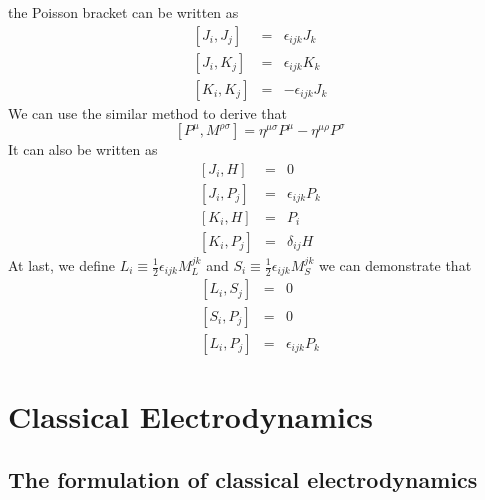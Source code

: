 \documentclass[cyan]{elegantnote}
\begin{document}
the Poisson bracket can be written as
\begin{eqnarray}
\left[J_i,J_j\right] &=& \epsilon_{ijk}J_k \nonumber \\
\left[J_i,K_j\right] &=& \epsilon_{ijk}K_k \nonumber \\
\left[K_i,K_j\right] &=& -\epsilon_{ijk}J_k \nonumber
\end{eqnarray}
We can use the similar method to derive that
\[[P^{\mu},M^{\rho \sigma}] = \eta^{\mu \sigma}P^{\mu} - \eta^{\mu \rho}P^{\sigma}\]
It can also be written as
\begin{eqnarray}
\left[J_i,H\right] &=& 0 \nonumber \\
\left[J_i,P_j\right] &=& \epsilon_{ijk}P_k \nonumber \\
\left[K_i,H\right] &=& P_i \nonumber \\
\left[K_i,P_j\right] &=& \delta_{ij}H \nonumber
\end{eqnarray}
At last, we define $L_i \equiv \frac{1}{2} \epsilon_{ijk} M_L^{jk}$ and $S_i \equiv \frac{1}{2} \epsilon_{ijk} M_S^{jk}$
we can demonstrate that
\begin{eqnarray}
\left[L_i,S_j\right] &=& 0 \nonumber \\
\left[S_i,P_j\right] &=& 0 \nonumber \\
\left[L_i,P_j\right] &=& \epsilon_{ijk}P_k \nonumber
\end{eqnarray}

\chapter{Classical Electrodynamics}
\section{The formulation of classical electrodynamics}
\end{document}
